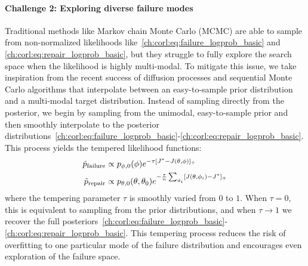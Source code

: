{\paragraph{Challenge 2: Exploring diverse failure modes} Traditional methods like Markov chain Monte Carlo (MCMC) are able to sample from non-normalized likelihoods like~\eqref{ch:corl:eq:failure_logprob_basic} and \eqref{ch:corl:eq:repair_logprob_basic}, but they struggle to fully explore the search space when the likelihood is highly multi-modal. To mitigate this issue, we take inspiration from the recent success of diffusion processes \cite{songScoreBasedGenerativeModeling2023,zhongGuidedConditionalDiffusion2022} and sequential Monte Carlo algorithms \cite{rubinoIntroductionRareEvent2009a} that interpolate between an easy-to-sample prior distribution and a multi-modal target distribution. Instead of sampling directly from the posterior, we begin by sampling from the unimodal, easy-to-sample prior and then smoothly interpolate to the posterior distributions~\eqref{ch:corl:eq:failure_logprob_basic}-\eqref{ch:corl:eq:repair_logprob_basic}. This process yields the tempered likelihood functions:
%
\begin{align}
    \tilde{p}_{\rm{failure}} & \propto p_{\phi, 0}(\phi)e^{-\tau[J^* - J(\theta, \phi)]_+} \label{ch:corl:eq:failure_logprob_tempered}                                     \\
    \tilde{p}_{\rm{repair}}  & \propto p_{\theta, 0}(\theta, \theta_0)e^{-\frac{\tau}{n}\sum_{\phi_i}[J(\theta, \phi_i)-J^*]_+} \label{ch:corl:eq:repair_logprob_tempered}
\end{align}
%
where the tempering parameter $\tau$ is smoothly varied from $0$ to $1$. When $\tau = 0$, this is equivalent to sampling from the prior distributions, and when $\tau \to 1$ we recover the full posteriors~\eqref{ch:corl:eq:failure_logprob_basic}-\eqref{ch:corl:eq:repair_logprob_basic}. This tempering process reduces the risk of overfitting to one particular mode of the failure distribution and encourages even exploration of the failure space.

}
